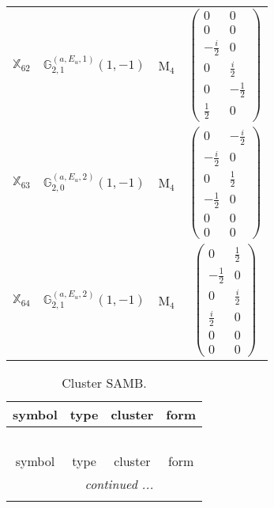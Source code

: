 \documentclass[fleqn,10pt,landscape]{article}
\begin{document}
\begin{itemize}
\begin{center}
\begin{longtable}{c|c|c|c}
$ \mathbb{X}_{62} $ & $\mathbb{G}_{2,1}^{(a,E_{u},1)}(1,-1)$ & M$_{4}$ & $\begin{pmatrix} 0 & 0 \\ 0 & 0 \\ - \frac{i}{2} & 0 \\ 0 & \frac{i}{2} \\ 0 & - \frac{1}{2} \\ \frac{1}{2} & 0 \end{pmatrix}$ \\
$ \mathbb{X}_{63} $ & $\mathbb{G}_{2,0}^{(a,E_{u},2)}(1,-1)$ & M$_{4}$ & $\begin{pmatrix} 0 & - \frac{i}{2} \\ - \frac{i}{2} & 0 \\ 0 & \frac{1}{2} \\ - \frac{1}{2} & 0 \\ 0 & 0 \\ 0 & 0 \end{pmatrix}$ \\
$ \mathbb{X}_{64} $ & $\mathbb{G}_{2,1}^{(a,E_{u},2)}(1,-1)$ & M$_{4}$ & $\begin{pmatrix} 0 & \frac{1}{2} \\ - \frac{1}{2} & 0 \\ 0 & \frac{i}{2} \\ \frac{i}{2} & 0 \\ 0 & 0 \\ 0 & 0 \end{pmatrix}$ \\
\end{longtable}
\end{center}
\begin{center}
\renewcommand{\arraystretch}{1.3}
\begin{longtable}{c|c|c|c}
\caption{Cluster SAMB.}
 \\
 \hline \hline
symbol & type & cluster & form \\ \hline \endfirsthead

\multicolumn{3}{l}{\tablename\ \thetable{}} \\
 \hline \hline
symbol & type & cluster & form \\ \hline \endhead

 \hline \hline
\multicolumn{3}{r}{\footnotesize\it continued ...} \\ \endfoot


\end{longtable}
\end{center}
\end{itemize}
\end{document}
